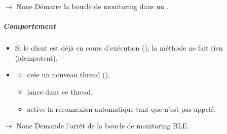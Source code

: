 \documentclass[letterpaper,10pt,french]{sphinxmanual}
\begin{document}
\begin{fulllineitems}
\begin{fulllineitems}
\end{fulllineitems}


\begin{fulllineitems}
\label{\detokenize{api/hardware.transports:hardware.transports.ble_client.BleClient.start}}
\pysigstartsignatures
\pysiglinewithargsret
{}
{}
{{ $\rightarrow$ None}}
\pysigstopsignatures
\sphinxAtStartPar
Démarre la boucle de monitoring dans un .


\subparagraph{Comportement}
\label{\detokenize{api/hardware.transports:comportement}}\begin{itemize}
\item {} 
\sphinxAtStartPar
Si le client est déjà en cours d’exécution (),
la méthode ne fait rien (idempotent).

\item {} \begin{description}
\begin{itemize}
\item {} 
\sphinxAtStartPar
crée un nouveau thread (),

\item {} 
\sphinxAtStartPar
lance  dans ce thread,

\item {} 
\sphinxAtStartPar
active la reconnexion automatique tant que  n’est pas appelé.

\end{itemize}

\end{description}

\end{itemize}

\end{fulllineitems}


\begin{fulllineitems}
\label{\detokenize{api/hardware.transports:hardware.transports.ble_client.BleClient.stop}}
\pysigstartsignatures
\pysiglinewithargsret
{}
{}
{{ $\rightarrow$ None}}
\pysigstopsignatures
\sphinxAtStartPar
Demande l’arrêt de la boucle de monitoring BLE.



\end{fulllineitems}
\end{fulllineitems}
\end{document}
